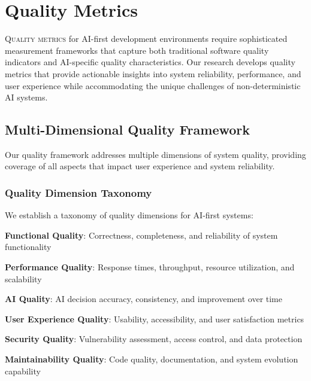 
\section*{Quality Metrics}

\lettrine{Q}{uality metrics} for AI-first development environments require sophisticated measurement frameworks that capture both traditional software quality indicators and AI-specific quality characteristics. Our research develops quality metrics that provide actionable insights into system reliability, performance, and user experience while accommodating the unique challenges of non-deterministic AI systems.

\subsection*{Multi-Dimensional Quality Framework}

Our quality framework addresses multiple dimensions of system quality, providing coverage of all aspects that impact user experience and system reliability.

\subsubsection*{Quality Dimension Taxonomy}

We establish a taxonomy of quality dimensions for AI-first systems:

\begin{expandedlist}
    \item \textbf{Functional Quality}: Correctness, completeness, and reliability of system functionality
    \item \textbf{Performance Quality}: Response times, throughput, resource utilization, and scalability
    \item \textbf{AI Quality}: AI decision accuracy, consistency, and improvement over time
    \item \textbf{User Experience Quality}: Usability, accessibility, and user satisfaction metrics
    \item \textbf{Security Quality}: Vulnerability assessment, access control, and data protection
    \item \textbf{Maintainability Quality}: Code quality, documentation, and system evolution capability
\end{expandedlist}

